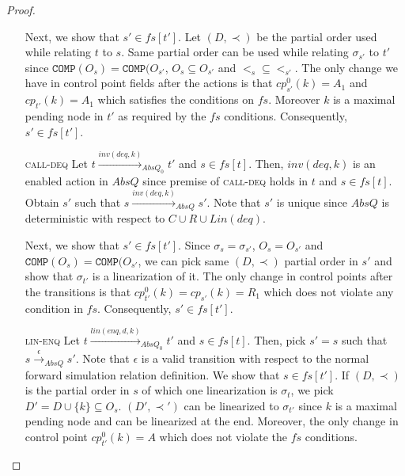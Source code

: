 \begin{proof}
\begin{itemize}
Next, we show that $s' \in fs[t']$. Let $(D, \prec)$ be the partial order used while relating $t$ to $s$. Same partial order can be used while relating $\sigma_{s'}$ to $t'$ since $\texttt{COMP}(O_s) = \texttt{COMP}(O_{s'}$, $O_s \subseteq O_{s'}$ and $<_s \subseteq <_{s'}$. The only change we have in control point fields after the actions is that $cp^0_{s'}(k)= A_1$ and $cp_{t'}(k)=A_1$ which satisfies the conditions on $fs$. Moreover $k$ is a maximal pending node in $t'$ as required by the $fs$ conditions. Consequently, $s' \in fs[t']$.

\item[\textsc{call-deq}] Let $t \xrightarrow{inv(deq,k)}_{AbsQ_0} t'$ and $s \in fs[t]$. Then, $inv(deq,k)$ is an enabled action in $AbsQ$ since premise of \textsc{call-deq} holds in $t$ and $s \in fs[t]$. Obtain $s'$ such that $s \xrightarrow{inv(deq,k)}_{AbsQ} s'$. Note that $s'$ is unique since $AbsQ$ is deterministic with respect to $C \cup R \cup Lin(deq)$. 

Next, we show that $s' \in fs[t']$. Since $\sigma_s =\sigma_{s'}$, $O_s = O_{s'}$ and $\texttt{COMP}(O_s) = \texttt{COMP}(O_{s'}$, we can pick same $(D,\prec)$  partial order in $s'$ and show that $\sigma_{t'}$ is a linearization of it. The only change in control points after the transitions is that $cp^0_{t'}(k) = cp_{s'}(k) = R_1$ which does not violate any condition in $fs$. Consequently, $s' \in fs[t']$. 

\item[\textsc{lin-enq}] Let $t \xrightarrow{lin(enq,d,k)}_{AbsQ_0} t'$ and $s \in fs[t]$. Then, pick $s' = s$ such that $s \xrightarrow{\epsilon}_{AbsQ} s'$. Note that $\epsilon$ is a valid transition with respect to the normal forward simulation relation definition. We show that $s \in fs[t']$. If $(D, \prec)$ is the partial order in $s$ of which one linearization is $\sigma_t$, we pick $D' = D \cup \{k\} \subseteq O_s$. $(D', \prec')$ can be linearized to $\sigma_{t'}$ since $k$ is a maximal pending node and can be linearized at the end. Moreover, the only change in control point $cp^0_{t'}(k) = A$ which does not violate the $fs$ conditions.


\end{itemize}
\end{proof}
